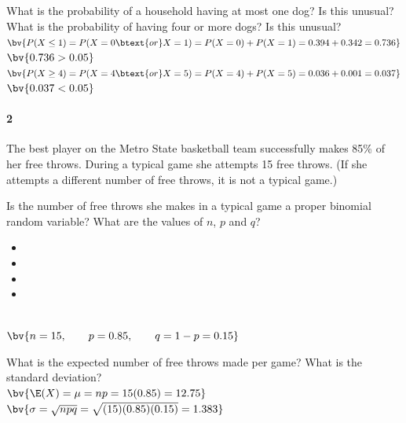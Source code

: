 \documentclass{article}
\begin{document}
\begin{flushleft}
\begin{enumalpha}
\vspace{0.25in}
\item What is the probability of a household having at most one dog? Is this unusual? What is the probability of having four or more dogs? Is this unusual?\\
\medskip
$\bv{P(X \le 1) = P(X =0 \btext{ or } X = 1) = P(X=0) + P(X=1) = 0.394 + 0.342 = 0.736}$\\
$\bv{0.736 > 0.05}$ \\
$\bv{P(X \ge 4) = P(X =4 \btext{ or } X = 5) = P(X=4) + P(X=5) = 0.036 + 0.001 = 0.037} $
$\bv{0.037 < 0.05}$ \\
\end{enumalpha}



\newpage
\paragraph{2} The best player on the Metro State basketball team successfully makes 85\% of her free throws. During a typical game she attempts 15 free throws. (If she attempts a different number of free throws, it is not a typical game.)
\begin{enumalpha}
\item Is the number of free throws she makes in a typical game a proper binomial random variable? What are the values of $n$, $p$ and $q$?\\
\medskip
\begin{itemize}
\item {}
\item {}
\item {}
\item {}
\end{itemize}
\\
\medskip
$\bv{n= 15, \qquad p = 0.85, \qquad q = 1-p = 0.15}$
\vspace{0.25in}

\item What is the expected number of free throws made per game? What is the standard deviation?\\
\medskip
{}$\bv{\E(X) = \mu = np = 15(0.85) = 12.75}$\\
$\bv{\sigma = \sqrt{npq} = \sqrt{(15)(0.85)(0.15)} = 1.383}$


\end{enumalpha}
\end{flushleft}
\end{document}
